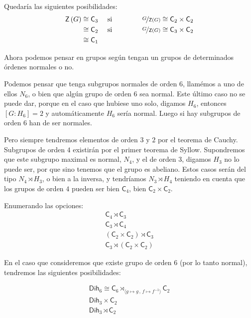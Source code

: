 \documentclass[12pt,a4paper,fleqn,spanish,final,openright]{extbook}
\theoremstyle{definition}
\theoremstyle{remark}
\begin{document}
 Quedaría las siguientes posibilidades: 
\begin{align}
\mathsf{Z}\left(G\right) &\cong \mathsf{C}_{3} &\text{ si }\quad\quad\quad\quad& 
\nicefrac{G}{\mathsf{Z}\left(G\right)}\cong \mathsf{C}_{2}\times \mathsf{C}_{2}\\
&\cong \mathsf{C}_{2}  &\text{ si }\quad\quad\quad\quad& \nicefrac{G}{\mathsf{Z}\left(G\right)}
\cong \mathsf{C}_{3}\times \mathsf{C}_{2}\\
&\cong \mathsf{C}_{1}&&
\end{align}

Ahora podemos pensar en grupos según tengan un grupos de determinados órdenes normales o no.

Podemos pensar que tenga subgrupos normales de orden $6$, llamémos a uno de ellos $N_6$, o bien que algún grupo de 
orden $6$ sea normal. Este último caso no se puede dar, porque en el caso que hubiese uno solo, digamos $H_6$, entonces $[G:H_6]=2$ y automáticamente $H_6$ sería normal. Luego si hay subgrupos de orden $6$ han de ser normales.

Pero siempre tendremos elementos de orden $3$ y $2$ por el teorema de Cauchy. Subgrupos de orden $4$ existirán por el primer teorema de Syllow. Supondremos que este subgrupo maximal es normal, $N_4$, y el de orden $3$, digamos $H_3$ no lo puede ser, por que sino tenemos que el grupo es abeliano. Estos casos serán del tipo $N_4\rtimes H_3$, o bien a la inversa, y tendríamos $N_3\rtimes H_4$ teniendo en cuenta que los grupos de orden $4$ pueden ser bien $\mathsf{C}_{4}$, bien $\mathsf{C}_{2} \times \mathsf{C}_{2}$.

Enumerando las opciones:
\begin{align}
\mathsf{C}_{4}\rtimes \mathsf{C}_{3}\\
\mathsf{C}_{3}\rtimes \mathsf{C}_{4}\\
\left(\mathsf{C}_{2}\times\mathsf{C}_{2}\right)\rtimes \mathsf{C}_{3}\\
\mathsf{C}_{3}\rtimes \left(\mathsf{C}_{2}\times\mathsf{C}_{2}\right)
\end{align}

En el caso que consideremos que existe grupo de orden $6$ (por lo tanto normal), tendremos las siguientes posibilidades:

\begin{align}
\mathsf{Dih}_{6}\cong\mathsf{C}_{6}\rtimes_{\langle{g\mapsto g\,,\,f\mapsto f^{-1}}\rangle} \mathsf{C}_{2}\\
\mathsf{Dih}_{3} \times \mathsf{C}_{2}\\
\mathsf{Dih}_{3} \rtimes \mathsf{C}_{2}
\end{align}
\end{document}
